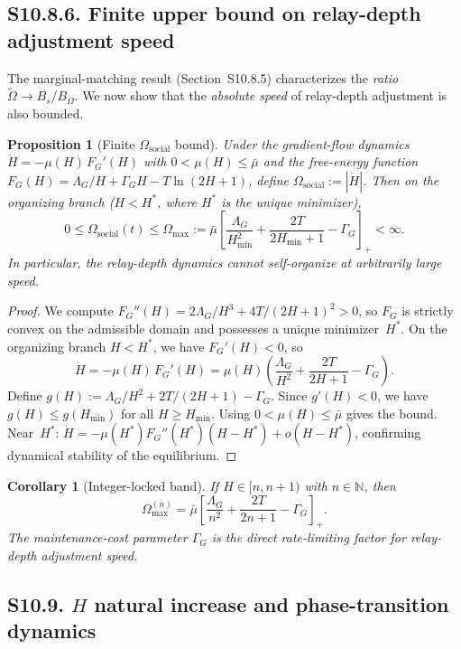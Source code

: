 \documentclass[11pt]{article}
\newtheorem{proposition}{Proposition}
\newtheorem{corollary}{Corollary}
\begin{document}
\subsection*{S10.8.6. Finite upper bound on relay-depth adjustment speed}

The marginal-matching result (Section~S10.8.5) characterizes the \emph{ratio}
$\tilde\Omega\to B_s/B_\Omega$.  We now show that the \emph{absolute speed}
of relay-depth adjustment is also bounded.

\begin{proposition}[Finite $\Omega_{\mathrm{social}}$ bound]
Under the gradient-flow dynamics $\dot H = -\mu(H)\,F_G'(H)$ with
$0 < \mu(H) \le \bar\mu$ and the free-energy function
$F_G(H) = \Lambda_G / H + \Gamma_G H - T\ln(2H+1)$,
define $\Omega_{\mathrm{social}} := |\dot H|$.
Then on the organizing branch ($H < H^*$, where $H^*$ is the unique minimizer),
\[
0 \le \Omega_{\mathrm{social}}(t) \le \Omega_{\max}
:= \bar\mu \left[\frac{\Lambda_G}{H_{\min}^2}
   + \frac{2T}{2H_{\min}+1} - \Gamma_G\right]_+ < \infty.
\]
In particular, the relay-depth dynamics cannot self-organize at arbitrarily
large speed.
\end{proposition}

\begin{proof}
We compute
$F_G''(H) = 2\Lambda_G / H^3 + 4T/(2H+1)^2 > 0$,
so $F_G$ is strictly convex on the admissible domain and possesses a unique
minimizer~$H^*$.  On the organizing branch $H < H^*$, we have $F_G'(H) < 0$, so
\[
\dot H = -\mu(H)\,F_G'(H)
= \mu(H)\!\left(\frac{\Lambda_G}{H^2} + \frac{2T}{2H+1} - \Gamma_G\right).
\]
Define $g(H) := \Lambda_G/H^2 + 2T/(2H+1) - \Gamma_G$.
Since $g'(H) < 0$, we have $g(H) \le g(H_{\min})$ for all $H \ge H_{\min}$.
Using $0 < \mu(H) \le \bar\mu$ gives the bound.
Near~$H^*$: $\dot H = -\mu(H^*) F_G''(H^*)(H - H^*) + o(H - H^*)$,
confirming dynamical stability of the equilibrium.
\end{proof}

\begin{corollary}[Integer-locked band]
If $H \in [n, n{+}1)$ with $n \in \mathbb{N}$, then
\[
\Omega_{\max}^{(n)}
= \bar\mu \left[\frac{\Lambda_G}{n^2}
  + \frac{2T}{2n+1} - \Gamma_G\right]_+.
\]
The maintenance-cost parameter $\Gamma_G$ is the direct rate-limiting factor
for relay-depth adjustment speed.
\end{corollary}

\subsection*{S10.9. $H$ natural increase and phase-transition dynamics}
\end{document}
